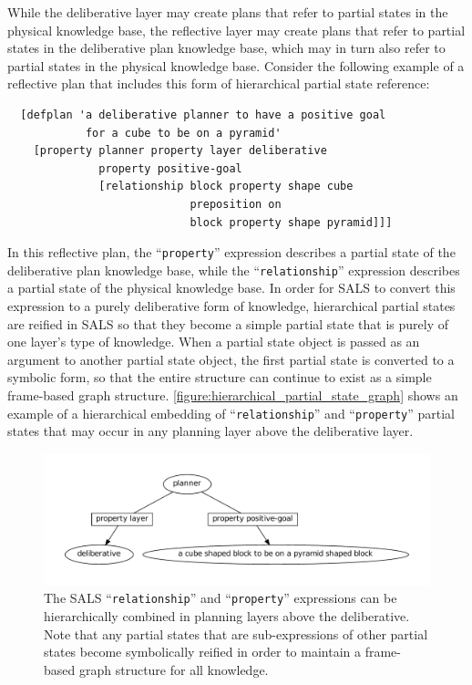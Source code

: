 While the deliberative layer may create plans that refer to partial
states in the physical knowledge base, the reflective layer may create
plans that refer to partial states in the deliberative plan knowledge
base, which may in turn also refer to partial states in the physical
knowledge base.  Consider the following example of a reflective plan
that includes this form of hierarchical partial state reference:
\begin{samepage}
\begin{Verbatim}
  [defplan 'a deliberative planner to have a positive goal
            for a cube to be on a pyramid'
    [property planner property layer deliberative
              property positive-goal
              [relationship block property shape cube
                            preposition on
                            block property shape pyramid]]]
\end{Verbatim}
\end{samepage}
In this reflective plan, the ``{\tt{property}}'' expression describes
a partial state of the deliberative plan knowledge base, while the
``{\tt{relationship}}'' expression describes a partial state of the
physical knowledge base.  In order for SALS to convert this expression
to a purely deliberative form of knowledge, hierarchical partial
states are reified in SALS so that they become a simple partial state
that is purely of one layer's type of knowledge.  When a partial state
object is passed as an argument to another partial state object, the
first partial state is converted to a symbolic form, so that the
entire structure can continue to exist as a simple frame-based graph
structure.  {\mbox{\autoref{figure:hierarchical_partial_state_graph}}}
shows an example of a hierarchical embedding of
``{\tt{relationship}}'' and ``{\tt{property}}'' partial states that
may occur in any planning layer above the deliberative layer.
\begin{figure}
\centering
\includegraphics[width=12cm]{gfx/hierarchical_partial_state_graph}
\caption[The SALS ``{\tt{relationship}}'' and ``{\tt{property}}''
  expressions can be hierarchically combined in planning layers above
  the deliberative.]{The SALS ``{\tt{relationship}}'' and
  ``{\tt{property}}'' expressions can be hierarchically combined in
  planning layers above the deliberative.  Note that any partial
  states that are sub-expressions of other partial states become
  symbolically reified in order to maintain a frame-based graph
  structure for all knowledge.}
\label{figure:hierarchical_partial_state_graph}
\end{figure}

